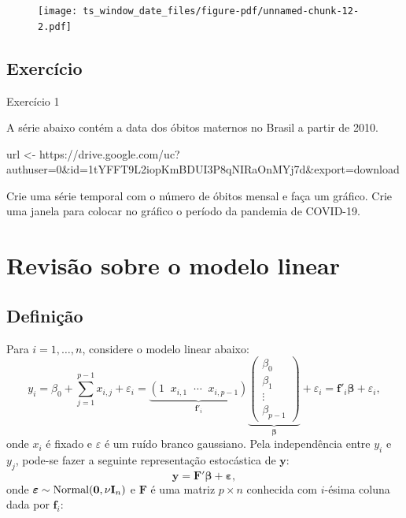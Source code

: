 \documentclass[
  letterpaper,
  DIV=11,
  numbers=noendperiod]{scrreprt}
\newenvironment{Shaded}{\begin{snugshade}}{\end{snugshade}}
\newcommand{\NormalTok}[1]{\textcolor[rgb]{0.00,0.23,0.31}{#1}}
\newcommand{\OtherTok}[1]{\textcolor[rgb]{0.00,0.23,0.31}{#1}}
\newcommand{\StringTok}[1]{\textcolor[rgb]{0.13,0.47,0.30}{#1}}
\theoremstyle{plain}
\theoremstyle{definition}
\theoremstyle{definition}
\theoremstyle{remark}
\begin{document}
\begin{figure}[H]

{\centering \texttt{[image: ts\_window\_date\_files/figure-pdf/unnamed-chunk-12-2.pdf]}

}

\end{figure}

\hypertarget{exercuxedcio}{%
\section{Exercício}\label{exercuxedcio}}

Exercício 1

A série abaixo contém a data dos óbitos maternos no Brasil a partir de
2010.

\begin{Shaded}
\begin{Highlighting}[]
\NormalTok{url }\OtherTok{\textless{}{-}} \StringTok{\textquotesingle{}https://drive.google.com/uc?authuser=0\&id=1tYFFT9L2iopKmBDUI3P8qNIRaOnMYj7d\&export=download\textquotesingle{}}
\end{Highlighting}
\end{Shaded}

Crie uma série temporal com o número de óbitos mensal e faça um gráfico.
Crie uma janela para colocar no gráfico o período da pandemia de
COVID-19.


\hypertarget{revisuxe3o-sobre-o-modelo-linear}{%
\chapter{Revisão sobre o modelo
linear}\label{revisuxe3o-sobre-o-modelo-linear}}

\hypertarget{definiuxe7uxe3o}{%
\section{Definição}\label{definiuxe7uxe3o}}

Para \(i=1,\ldots,n\), considere o modelo linear abaixo:
\[y_i= \beta_0+\sum_{j=1}^{p-1}x_{i,j}+\varepsilon_i=\underbrace{ \left(1\;\;x_{i,1}\;\;\cdots\;\;x_{i,p-1}\right)}_\text{$\boldsymbol{f}'_i$}\underbrace{\left(\begin{array}{c}\beta_0 \\ \beta_1 \\ \vdots \\ \beta_{p-1} 
        \end{array}\right)}_\text{$\boldsymbol{\beta}$}+\varepsilon_i=\boldsymbol{f}'_i\boldsymbol{\beta}+\varepsilon_i,\]
onde \(x_i\) é fixado e \(\varepsilon\) é um ruído branco gaussiano.
Pela independência entre \(y_i\) e \(y_j\), pode-se fazer a seguinte
representação estocástica de \(\boldsymbol{y}\): \[\begin{equation}
        \boldsymbol{y}=\boldsymbol{F}'\boldsymbol{\beta} + \boldsymbol{\varepsilon},
        \end{equation}\] onde
\(\boldsymbol{\varepsilon}\sim\hbox{Normal}(\boldsymbol{0},\nu\textbf{I}_n)\)
e \(\boldsymbol{F}\) é uma matriz \(p\times n\) conhecida com
\(i\)-ésima coluna dada por \(\boldsymbol{f}_i\):
\end{document}
